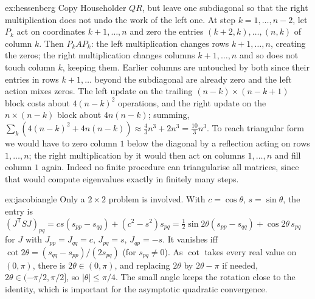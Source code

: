 \begin{solution}{ex:hessenberg}
\idea Copy Householder $QR$, but leave one subdiagonal so that the right multiplication does not undo the work of the left one.
\writeup At step $k=1,\dots,n-2$, let $P_k$ act on coordinates $k+1,\dots,n$ and zero the entries $(k+2,k),\dots,(n,k)$ of column $k$. Then $P_kAP_k$: the
left multiplication changes rows $k+1,\dots,n$, creating the zeros; the right multiplication changes columns $k+1,\dots,n$ and so does not touch column
$k$, keeping them. Earlier columns are untouched by both since their entries in rows $k+1,\dots$ beyond the subdiagonal are already zero and the left
action mixes zeros. The left update on the trailing $(n-k)\times(n-k+1)$ block costs about $4(n-k)^2$ operations, and the right update on the $n\times(n-k)$
block about $4n(n-k)$; summing, $\sum_k(4(n-k)^2+4n(n-k))\approx\frac43n^3+2n^3=\frac{10}3n^3$. To reach triangular form we would have to zero column $1$
below the diagonal by a reflection acting on rows $1,\dots,n$; the right multiplication by it would then act on columns $1,\dots,n$ and fill column $1$ again.
Indeed no finite procedure can triangularise all matrices, since that would compute eigenvalues exactly in finitely many steps.
\end{solution}

\begin{solution}{ex:jacobiangle}
\idea Only a $2\times2$ problem is involved.
\writeup With $c=\cos\theta$, $s=\sin\theta$, the entry is $(J^{\mathsf T}SJ)_{pq}=cs(s_{pp}-s_{qq})+(c^2-s^2)s_{pq}=\frac12\sin2\theta(s_{pp}-s_{qq})+\cos2\theta\,s_{pq}$
for $J$ with $J_{pp}=J_{qq}=c$, $J_{pq}=s$, $J_{qp}=-s$. It vanishes iff $\cot2\theta=(s_{qq}-s_{pp})/(2s_{pq})$ (for $s_{pq}\ne0$). As $\cot$ takes every real value
on $(0,\pi)$, there is $2\theta\in(0,\pi)$, and replacing $2\theta$ by $2\theta-\pi$ if needed, $2\theta\in(-\pi/2,\pi/2]$, so $|\theta|\le\pi/4$. The small angle
keeps the rotation close to the identity, which is important for the asymptotic quadratic convergence.
\end{solution}

